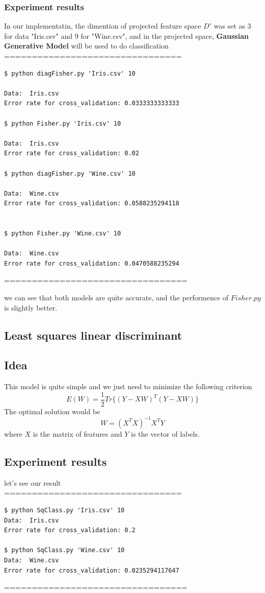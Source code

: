 \documentclass[12pt]{amsart}
\begin{document}
\subsubsection*{Experiment results}
In our implementatin, the dimention of projected feature space $D'$ was set as $3$ for
data "Iris.csv" and $9$ for "Wine.csv", and in the projected space, \textbf{Gaussian Generative Model} will be used to do classification\\
================================


\begin{verbatim}
$ python diagFisher.py 'Iris.csv' 10

Data:  Iris.csv
Error rate for cross_validation: 0.0333333333333

$ python Fisher.py 'Iris.csv' 10

Data:  Iris.csv
Error rate for cross_validation: 0.02

$ python diagFisher.py 'Wine.csv' 10

Data:  Wine.csv
Error rate for cross_validation: 0.0588235294118


$ python Fisher.py 'Wine.csv' 10

Data:  Wine.csv
Error rate for cross_validation: 0.0470588235294
\end{verbatim}
=================================

we can see that both models are quite accurate, and the performence of $Fisher.py$ is 
slightly better.



\subsection*{Least squares linear discriminant}
\subsection*{Idea}
This model is quite simple and we just need to minimize the following criterion
$$
	E(W) = \frac{1}{2}Tr\big \{ (Y - XW)^T (Y-XW) \big \}
$$
The optimal solution would be
$$
	W = (X^TX)^{-1}X^TY
$$
where $X$ is the matrix of features and $Y$ is the vector of labels.

\subsection*{Experiment results}
let's see our result\\
================================
\begin{verbatim}
$ python SqClass.py 'Iris.csv' 10
Data:  Iris.csv
Error rate for cross_validation: 0.2

$ python SqClass.py 'Wine.csv' 10
Data:  Wine.csv
Error rate for cross_validation: 0.0235294117647
\end{verbatim}
=================================
\end{document}
